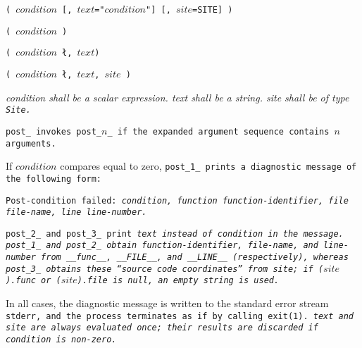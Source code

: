 
\s\s\s\tt{(} $condition$
 [\tt{,} $text$\tt{="}$condition$\tt{"}]
 [\tt{,} $site$\tt{=SITE}] \tt{)}

\s\tt{(} $condition$ \tt{)}

\s\tt{(} $condition$
\l\tt{,} $text$\r \tt{)}

\s\tt{(} $condition$
\l\tt{,} $text$\r
  \tt{,} $site$ \tt{)}


\it{condition} shall be a scalar expression.
\it{text} shall be a string.
\it{site} shall be of type \tt{Site}.


\tt{post_} invokes \tt{post_}$n$\_ if the
expanded argument sequence contains $n$ arguments.

If $condition$ compares equal to zero, \tt{post_1_}
prints a diagnostic message of the following form:

\begin{center}
\tt{Post-condition failed:} \it{condition}\tt{, function}
\it{function-identifier}\tt{, file}
\it{file-name}\tt{, line}
\it{line-number}\tt{.}
\end{center}

\tt{post_2_} and \tt{post_3_} print \it{text}
instead of \it{condition} in the message.
\tt{post_1_} and \tt{post_2_} obtain \it{function-identifier}, \it{file-name},
and \it{line-number} from \tt{__func__}, \tt{__FILE__}, and \tt{__LINE__}
(respectively), whereas \tt{post_3_} obtains these ``source code
coordinates'' from \it{site}; if \tt{(}$site$\tt{).func} or
\tt{(}$site$\tt{).file} is null, an empty string is used.

In all cases, the diagnostic message is written to the standard error stream
\tt{stderr}, and the process terminates as if by calling \tt{exit(1)}.
\it{text} and \it{site} are always evaluated once;
their results are discarded if \it{condition} is non-zero.
